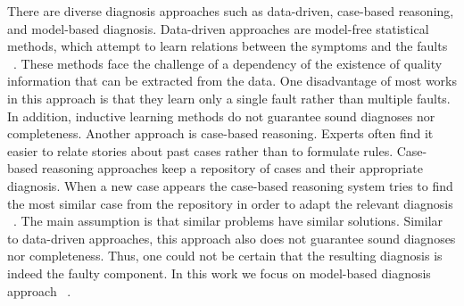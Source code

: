 \documentclass[a4paper,11pt]{report}
\begin{document}
There are diverse diagnosis approaches such as data-driven, case-based reasoning, and model-based diagnosis.
Data-driven approaches are model-free statistical methods, which attempt to learn relations between the symptoms and the faults ~\cite{murray2005machine}. These methods face the challenge of a dependency of the existence of quality information that can be extracted from the data. One disadvantage of most works in this approach is that they learn only a single fault rather than multiple faults. In addition, inductive learning methods do not guarantee sound diagnoses nor completeness.
Another approach is case-based reasoning. Experts often find it easier to relate stories about past cases rather than to formulate rules. Case-based reasoning approaches keep a repository of cases and their appropriate diagnosis. When a new case appears the case-based reasoning system tries to find the most similar case from the repository in order to adapt the relevant diagnosis ~\cite{aamodt1994case}. The main assumption is that similar problems have similar solutions. Similar to data-driven approaches, this approach also does not guarantee sound diagnoses nor completeness. Thus, one could not be certain that the resulting diagnosis is indeed the faulty component.
In this work we focus on model-based diagnosis approach ~\cite{reiter1987theory}.
\end{document}
